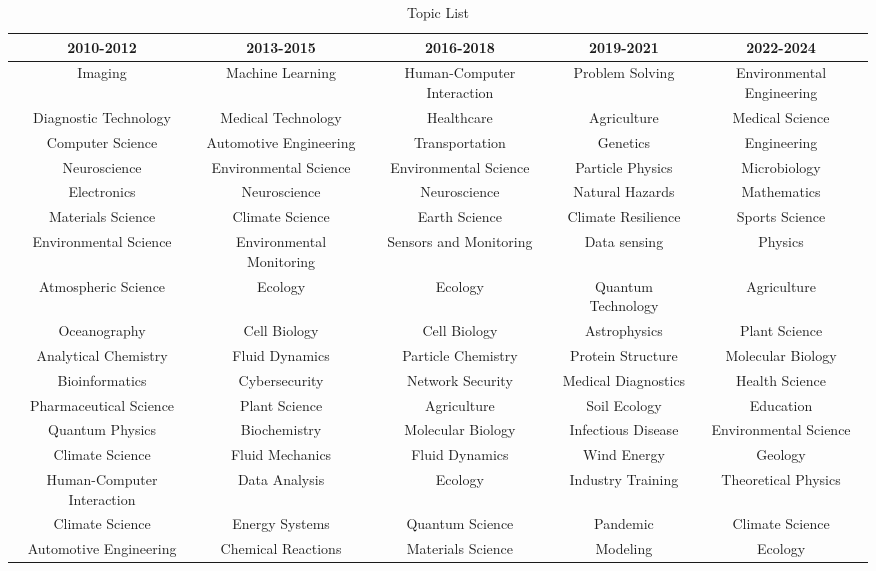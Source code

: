 \begin{table}[H]

    \caption{Topic List}
    \label{tab: Topic List}

    \begin{adjustbox}{width=\textwidth} 
        \begin{tabular}{ *{5}{c} } 
            \toprule
            2010-2012 & 2013-2015 & 2016-2018 & 2019-2021 & 2022-2024 \\
            \midrule
            Imaging	&	Machine Learning	&	Human-Computer Interaction	&	Problem Solving	&	Environmental Engineering	\\
Diagnostic Technology	&	Medical Technology	&	Healthcare	&	Agriculture	&	Medical Science	\\
Computer Science	&	Automotive Engineering	&	Transportation	&	Genetics	&	Engineering	\\
Neuroscience	&	Environmental Science	&	Environmental Science	&	Particle Physics	&	Microbiology	\\
Electronics	&	Neuroscience	&	Neuroscience	&	Natural Hazards	&	Mathematics	\\
Materials Science	&	Climate Science	&	Earth Science	&	Climate Resilience	&	Sports Science	\\
Environmental Science	&	Environmental Monitoring	&	Sensors and Monitoring	&	Data sensing	&	Physics	\\
Atmospheric Science	&	Ecology	&	Ecology	&	Quantum Technology	&	Agriculture	\\
Oceanography	&	Cell Biology	&	Cell Biology	&	Astrophysics	&	Plant Science	\\
Analytical Chemistry	&	Fluid Dynamics	&	Particle Chemistry	&	Protein Structure	&	Molecular Biology	\\
Bioinformatics	&	Cybersecurity	&	Network Security	&	Medical Diagnostics	&	Health Science	\\
Pharmaceutical Science	&	Plant Science	&	Agriculture	&	Soil Ecology	&	Education	\\
Quantum Physics	&	Biochemistry	&	Molecular Biology	&	Infectious Disease	&	Environmental Science	\\
Climate Science	&	Fluid Mechanics	&	Fluid Dynamics	&	Wind Energy	&	Geology	\\
Human-Computer Interaction	&	Data Analysis	&	Ecology	&	Industry Training	&	Theoretical Physics	\\
Climate Science	&	Energy Systems	&	Quantum Science	&	Pandemic	&	Climate Science	\\
Automotive Engineering	&	Chemical Reactions	&	Materials Science	&	Modeling	&	Ecology	\\

\end{tabular}
\end{adjustbox}
\end{table}
